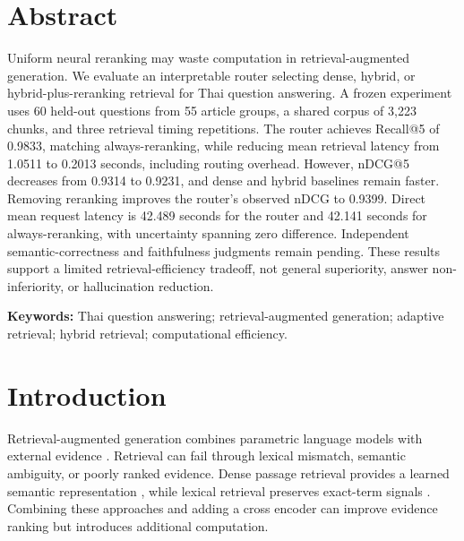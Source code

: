 \documentclass[10pt,a4paper]{article}
\begin{document}
\hypertarget{abstract}{%
\section*{Abstract}\label{abstract}}

Uniform neural reranking may waste computation in retrieval-augmented
generation. We evaluate an interpretable router selecting dense, hybrid,
or hybrid-plus-reranking retrieval for Thai question answering. A frozen
experiment uses 60 held-out questions from 55 article groups, a shared
corpus of 3,223 chunks, and three retrieval timing repetitions. The
router achieves Recall@5 of 0.9833, matching always-reranking, while
reducing mean retrieval latency from 1.0511 to 0.2013 seconds, including
routing overhead. However, nDCG@5 decreases from 0.9314 to 0.9231, and
dense and hybrid baselines remain faster. Removing reranking improves
the router's observed nDCG to 0.9399. Direct mean request latency is
42.489 seconds for the router and 42.141 seconds for always-reranking,
with uncertainty spanning zero difference. Independent
semantic-correctness and faithfulness judgments remain pending. These
results support a limited retrieval-efficiency tradeoff, not general
superiority, answer non-inferiority, or hallucination reduction.

\textbf{Keywords:} Thai question answering; retrieval-augmented
generation; adaptive retrieval; hybrid retrieval; computational
efficiency.

\hypertarget{introduction}{%
\section{Introduction}\label{introduction}}

Retrieval-augmented generation combines parametric language models with
external evidence \citep{ref1}. Retrieval can fail through lexical
mismatch, semantic ambiguity, or poorly ranked evidence. Dense passage
retrieval provides a learned semantic representation \citep{ref2}, while
lexical retrieval preserves exact-term signals \citep{ref3}. Combining
these approaches and adding a cross encoder can improve evidence ranking
but introduces additional computation.
\end{document}
